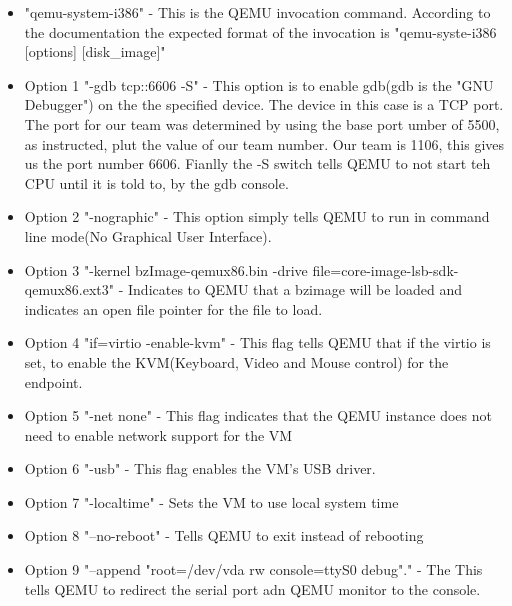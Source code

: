 \documentclass[letterpaper,10pt,draftclsnofoot,onecolumn]{IEEEtran}
\begin{document}
\begin{itemize}
\item "qemu-system-i386" - This is the QEMU invocation command. According to the documentation the expected format of the invocation is "qemu-syste-i386 [options] [disk\_image]" \cite{QEMUDOC1} 
\item Option 1 "-gdb tcp::6606 -S" - This option is to enable gdb(gdb is the "GNU Debugger") on the the specified device. The device in this case is a TCP port. The port for our team was determined by using the base port umber of 5500, as instructed, plut the value of our team number. Our team is 1106, this gives us the port number 6606. Fianlly the -S switch tells QEMU to not start teh CPU until it is told to, by the gdb console. \cite{QEMUDOC1}
\item Option 2 "-nographic" - This option simply tells QEMU to run in command line mode(No Graphical User Interface).\cite{QEMUDOC1}
\item Option 3 "-kernel bzImage-qemux86.bin -drive file=core-image-lsb-sdk-qemux86.ext3" - Indicates to QEMU that a bzimage will be loaded and indicates an open file pointer for the file to load. \cite{QEMUDOC1}
\item Option 4 "if=virtio -enable-kvm" - This flag tells QEMU that if the virtio is set, to enable the KVM(Keyboard, Video and Mouse control) for the endpoint. \cite{QEMUDOC1}
\item Option 5 "-net none" - This flag indicates that the QEMU instance does not need to enable network support for the VM\cite{QEMUDOC1}
\item Option 6 "-usb" - This flag enables the VM's USB driver.\cite{QEMUDOC1}
\item Option 7 "-localtime" - Sets the VM to use local system time\cite{QEMUDOC1}
\item Option 8 "--no-reboot" - Tells QEMU to exit instead of rebooting\cite{QEMUDOC1}
\item Option 9 "--append "root=/dev/vda rw console=ttyS0 debug"." - The This tells QEMU to redirect the serial port adn QEMU monitor to the console.\cite{QEMUDOC1}
\end{itemize}




%
\end{document}
